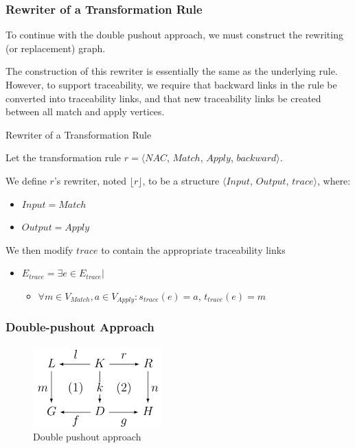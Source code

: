 \subsubsection*{Rewriter of a Transformation Rule}

To continue with the double pushout approach, we must construct the rewriting (or replacement) graph.

The construction of this rewriter is essentially the same as the underlying rule. However, to support traceability, we require that backward links in the rule be converted into traceability links, and that new traceability links be created between all match and apply vertices. 

\begin{definition}{Rewriter of a Transformation Rule\\}
\label{def:rewriter_transformation_rule}

Let the transformation rule $r = \big\langle \mathit{NAC}$, $\mathit{Match}$, $\mathit{Apply}$, $\mathit{backward}\big\rangle$.

We define $r$'s rewriter, noted $\lfloor r \rfloor$, to be a structure $\big\langle \mathit{Input}$, $\mathit{Output}$, $\mathit{trace}\big\rangle$, where:

\begin{itemize}
\item $ \mathit{Input} = \mathit{Match}$
\item $ \mathit{Output} = \mathit{Apply}$
\end{itemize}

We then modify $\mathit{trace}$ to contain the appropriate traceability links

\begin{itemize}
\item $E_{trace} = \exists e \in E_{trace} | $
\begin{itemize}
\item $ \forall m \in V_{Match}, a \in V_{Apply}:$$s_{trace}(e) = a$, $t_{trace}(e) = m$ 
\end{itemize}
\end{itemize}

\end{definition}

\subsubsection*{Double-pushout Approach}

\begin{figure}[h!] \centering
\includegraphics[width=0.44\textwidth]{figures/formal/dpo}
	\caption{Double pushout approach}
	\label{fig:dpo}
\end{figure}

